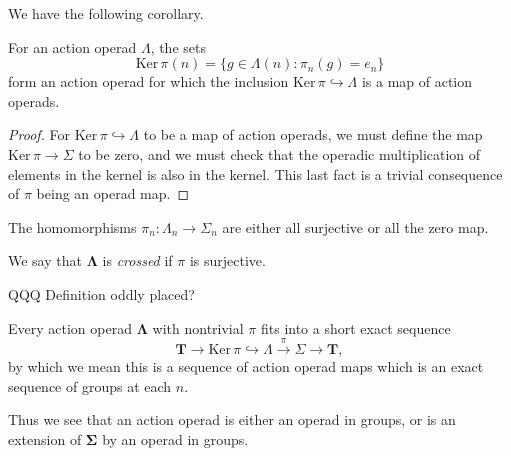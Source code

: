 \documentclass{amsbook} %
\newcommand{\mb}{\mathbf}
\newcommand{\ML}{\mathbf{\Lambda}}
\numberwithin{section}{chapter}
\begin{document}
We have the following corollary.
\begin{cor}\label{corZ}
For an action operad $\Lambda$, the sets
\[
\textrm{Ker}\,\pi(n) = \{g \in \Lambda(n) : \pi_{n}(g) = e_{n} \}
\]
form an action operad for which the inclusion $\textrm{Ker}\,\pi \hookrightarrow \Lambda$ is a map of action operads.
\end{cor}
\begin{proof}
For $\textrm{Ker}\,\pi \hookrightarrow \Lambda$ to be a map of action operads, we must define the map $\textrm{Ker}\,\pi \rightarrow \Sigma$ to be zero,  and we must check that the operadic multiplication of elements in the kernel is also in the kernel.  This last fact is a trivial consequence of $\pi$ being an operad map.
\end{proof}



\begin{prop}\label{zero/surj}
The homomorphisms $\pi_n : \Lambda_n \to \Sigma_n$ are either all surjective or all the zero map.
\end{prop}

\begin{Defi} 
We say that $\ML$ is \emph{crossed} if $\pi$ is surjective.
\end{Defi}
QQQ Definition oddly placed?
\begin{cor}\label{extension}
Every action operad $\ML$ with nontrivial $\pi$ fits into a short exact sequence
\[
\mb{T}\to \textrm{Ker}\,\pi \hookrightarrow \Lambda \stackrel{\pi}{\longrightarrow} \Sigma \to \mb{T},
\]
by which we mean this is a sequence of action operad maps which is an exact sequence of groups at each $n$.
\end{cor}

\begin{rem}
Thus we see that an action operad is either an operad in groups, or is an extension of $\mb{\Sigma}$ by an operad in groups.
\end{rem}
\end{document}
